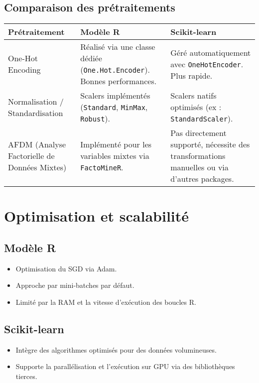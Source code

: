\documentclass[a4paper,12pt]{article}
\begin{document}
\subsection*{Comparaison des prétraitements}
\begin{longtable}{|p{5cm}|p{5cm}|p{5cm}|}
\hline
\textbf{Prétraitement} & \textbf{Modèle R} & \textbf{Scikit-learn} \\
\hline
One-Hot Encoding & Réalisé via une classe dédiée (\texttt{One.Hot.Encoder}). Bonnes performances. & Géré automatiquement avec \texttt{OneHotEncoder}. Plus rapide. \\
\hline
Normalisation / Standardisation & Scalers implémentés (\texttt{Standard}, \texttt{MinMax}, \texttt{Robust}). & Scalers natifs optimisés (ex : \texttt{StandardScaler}). \\
\hline
AFDM (Analyse Factorielle de Données Mixtes) & Implémenté pour les variables mixtes via \texttt{FactoMineR}. & Pas directement supporté, nécessite des transformations manuelles ou via d'autres packages. \\
\hline
\end{longtable}

\section*{Optimisation et scalabilité}

\subsection*{Modèle R}
\begin{itemize}
    \item Optimisation du SGD via Adam.
    \item Approche par mini-batches par défaut.
    \item Limité par la RAM et la vitesse d'exécution des boucles R.
\end{itemize}

\subsection*{Scikit-learn}
\begin{itemize}
    \item Intègre des algorithmes optimisés pour des données volumineuses.
    \item Supporte la parallélisation et l'exécution sur GPU via des bibliothèques tierces.
\end{itemize}
\end{document}
